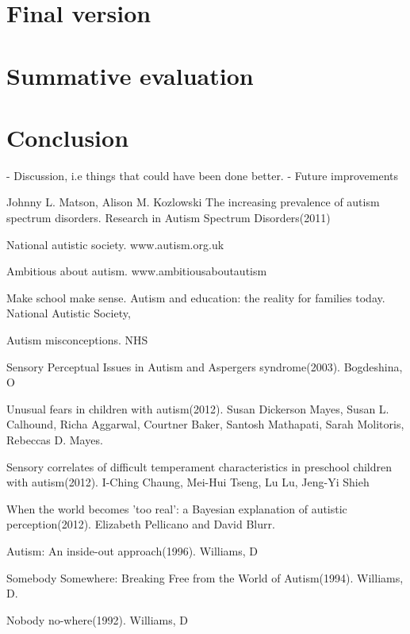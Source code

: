 \documentclass[11pt]{report}
\begin{document}
\chapter{Final version}

\chapter{Summative evaluation}

\chapter{Conclusion}
- Discussion, i.e things that could have been done better.
- Future improvements

\begin{thebibliography}{9}

Johnny L. Matson, Alison M. Kozlowski
The increasing prevalence of autism spectrum disorders. Research in Autism Spectrum Disorders(2011)

National autistic society. www.autism.org.uk

Ambitious about autism. www.ambitiousaboutautism

Make school make sense. Autism and education: the reality for families today. National Autistic Society, 

Autism misconceptions. NHS

Sensory Perceptual Issues in Autism and Aspergers syndrome(2003). Bogdeshina, O

Unusual fears in children with autism(2012). Susan Dickerson Mayes, Susan L. Calhound, Richa Aggarwal, Courtner Baker, Santosh Mathapati, Sarah Molitoris, Rebeccas D. Mayes.

Sensory correlates of difficult temperament characteristics in preschool children with autism(2012). I-Ching Chaung, Mei-Hui Tseng, Lu Lu, Jeng-Yi Shieh

When the world becomes 'too real': a Bayesian explanation of autistic perception(2012). Elizabeth Pellicano and David Blurr.

Autism: An inside-out approach(1996). Williams, D

Somebody Somewhere: Breaking Free from the World of Autism(1994). Williams, D.

Nobody no-where(1992). Williams, D


\end{thebibliography}
\end{document}
